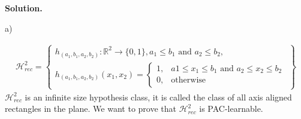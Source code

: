 \documentclass{article}
\newcommand{\<}{\langle}
\renewcommand{\>}{\rangle}
\theoremstyle{definition}
\def\gH{{\mathcal{H}}}
\def\sR{{\mathbb{R}}}
\newcommand{\hrs}{\gH_{rec}^2}
\newcommand{\sRs}{\sR^2}
\newcommand{\hrs}{\gH_{rec}^2}
\newcommand{\sRs}{\sR^2}
\begin{document}
\textbf{Solution.}

a)

\begin{align*}
\hrs = \left\{
  \begin{array}{ll}
   h_{(a_1, b_1, a_2, b_2)} \colon \sRs \rightarrow \{0, 1\},
     a_1 \leq b_1 \text{ and } a_2 \leq b_2, \\
   h_{(a_1, b_1, a_2, b_2)}(x_1, x_2) = 
     \begin{cases}
       1, & a1 \leq x_1 \leq b_1 \text{ and } a_2 \leq x_2 \leq b_2 \\
       0, &\text{otherwise}
     \end{cases}
  \end{array}
        \right\}
\end{align*}
$\hrs$ is an infinite size hypothesis class, it is called the class of all axis aligned
rectangles in the plane. We want to prove that $\hrs$ is PAC-learnable.
\end{document}

